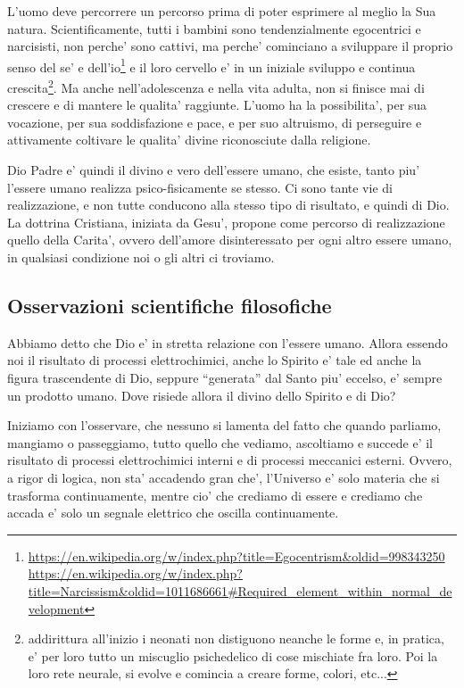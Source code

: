 L'uomo deve percorrere un percorso prima di poter esprimere al meglio la Sua natura. Scientificamente, tutti i bambini sono tendenzialmente egocentrici e narcisisti, non perche' sono cattivi, ma perche' cominciano a sviluppare il proprio senso del se' e dell'io\footnote{\url{https://en.wikipedia.org/w/index.php?title=Egocentrism\&oldid=998343250} \url{https://en.wikipedia.org/w/index.php?title=Narcissism\&oldid=1011686661\#Required\_element\_within\_normal\_development}} e il loro cervello e' in un iniziale sviluppo e continua crescita\footnote{addirittura all'inizio i neonati non distiguono neanche le forme e, in pratica, e' per loro tutto un miscuglio psichedelico di cose mischiate fra loro. Poi la loro rete neurale, si evolve e comincia a creare forme, colori, etc...}. Ma anche nell'adolescenza e nella vita adulta, non si finisce mai di crescere e di mantere le qualita' raggiunte. L'uomo ha la possibilita', per sua vocazione, per sua soddisfazione e pace, e per suo altruismo, di perseguire e attivamente coltivare le qualita' divine riconosciute dalla religione.

Dio Padre e' quindi il divino e vero dell'essere umano, che esiste, tanto piu' l'essere umano realizza psico-fisicamente se stesso. Ci sono tante vie di realizzazione, e non tutte conducono alla stesso tipo di risultato, e quindi di Dio. La dottrina Cristiana, iniziata da Gesu', propone come percorso di realizzazione quello della Carita', ovvero dell'amore disinteressato per ogni altro essere umano, in qualsiasi condizione noi o gli altri ci troviamo.

\subsection{Osservazioni scientifiche filosofiche}
\label{ossScientificheFilosofiche}

Abbiamo detto che Dio e' in stretta relazione con l'essere umano. Allora essendo noi il risultato di processi elettrochimici, anche lo Spirito e' tale ed anche la figura trascendente di Dio, seppure ``generata'' dal Santo piu' eccelso, e' sempre un prodotto umano. Dove risiede allora il divino dello Spirito e di Dio?

Iniziamo con l'osservare, che nessuno si lamenta del fatto che quando parliamo, mangiamo o passeggiamo, tutto quello che vediamo, ascoltiamo e succede e' il risultato di processi elettrochimici interni e di processi meccanici esterni. Ovvero, a rigor di logica, non sta' accadendo gran che', l'Universo e' solo materia che si trasforma continuamente, mentre cio' che crediamo di essere e crediamo che accada e' solo un segnale elettrico che oscilla continuamente.

